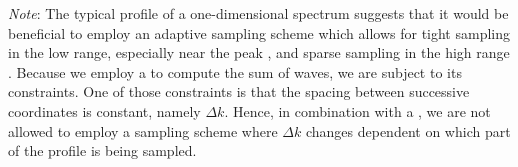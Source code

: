 \emph{Note}: The typical profile of a one-dimensional \wavenumber spectrum suggests
that it would be beneficial to employ an adaptive sampling scheme which allows
for tight sampling in the low \wavenumber range, especially near the peak
\wavenumber, and sparse sampling in the high \wavenumber range
\citep{article:frechot2007}. Because we employ a \DiscreteFourierTransform to
compute the sum of waves, we are subject to its constraints. One of
those constraints is that the spacing between successive coordinates is constant,
namely $\Delta k$. Hence, in combination with a \DiscreteFourierTransform, we
are not allowed to employ a sampling scheme where $\Delta k$ changes dependent
on which part of the \wavenumber profile is being sampled.
%
%
%
